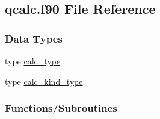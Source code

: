 \hypertarget{qcalc_8f90}{\subsection{qcalc.\-f90 File Reference}
\label{qcalc_8f90}
}
\subsubsection*{Data Types}
\begin{DoxyCompactItemize}
\item 
type \hyperlink{structcalc__type}{calc\-\_\-type}
\item 
type \hyperlink{structcalc__kind__type}{calc\-\_\-kind\-\_\-type}
\end{DoxyCompactItemize}
\subsubsection*{Functions/\-Subroutines}
